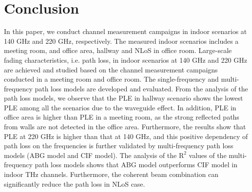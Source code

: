 \documentclass[conference]{IEEEtran}
\begin{document}
\section{Conclusion}
In this paper, we conduct channel measurement campaigns in indoor scenarios at 140 GHz and 220 GHz, respectively. The measured indoor scenarios includes a meeting room, and office area, hallway and NLoS in office room. Large-scale fading characteristics, i.e. path loss, in indoor scenarios at 140 GHz and 220 GHz are achieved and studied based on the channel measurement campaigns conducted in a meeting room and office room. The single-frequency and multi-frequency path loss models are developed and evaluated. From the analysis of the path loss models, we observe that the PLE in hallway scenario shows the lowest PLE among all the scenarios due to the waveguide effect. In addition, PLE in office area is higher than PLE in a meeting room, as the strong reflected paths from walls are not detected in the office area. Furthermore, the results show that PLE at 220 GHz is higher than that at 140 GHz, and this positive dependency of path loss on the frequencies is further validated by multi-frequency path loss models (ABG model and CIF model). The analysis of the $\text{R}^2$ values of the multi-frequency path loss models shows that ABG model outperforms CIF model in indoor THz channels. Furthermore, the coherent beam combination can significantly reduce the path loss in NLoS case.




\vfill
\end{document}
